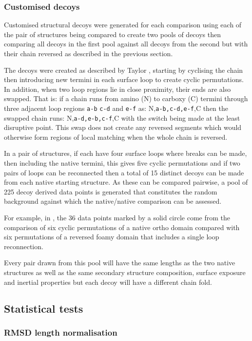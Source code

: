 \subsubsection{Customised decoys}

Customised structural decoys were generated for each comparison using each of the
pair of structures being compared to create two pools of decoys then comparing all
decoys in the first pool against all decoys from the second but with their chain
reversed as described in the previous section.

The decoys were created as described by Taylor \cite{}, starting by cyclising the
chain then introducing new termini in each surface loop to create cyclic permutations.
In addition, when two loop regions lie in close proximity, their ends are also 
swapped.   That is: if a chain runs from amino (N) to carboxy (C) termini through
three adjacent loop regions {\tt a-b} {\tt c-d} and {\tt e-f} as: N,{\tt a-b,c-d,e-f},C
then the swapped chain runs: N,{\tt a-d,e-b,c-f},C with the switch being made at the
least disruptive point.   This swap does not create any reversed segments which would
otherwise form regions of local matching when the whole chain is reversed.

In a pair of structures, if each have four surface loops where breaks can be made, then
including the native termini, this gives five cyclic permutations and if two pairs of 
loops can be reconnected then a total of 15 distinct decoys can be made from each native
starting structure.   As these can be compared pairwise, a pool of 225 decoy derived
data points is generated that constitutes the random background against which the native/native
comparison can be assessed.

For example, in , the 36 data
points marked by a solid circle come from the comparison of six cyclic permutations of a 
native ortho domain compared with six permutations of a reversed foamy domain that includes
a single loop reconnection.  

Every pair drawn from this pool will have the same lengths as the two native structures
as well as the same secondary structure composition, surface exposure and inertial properties
but each decoy will have a different chain fold.


\subsection{Statistical tests}

\subsubsection{RMSD length normalisation}

